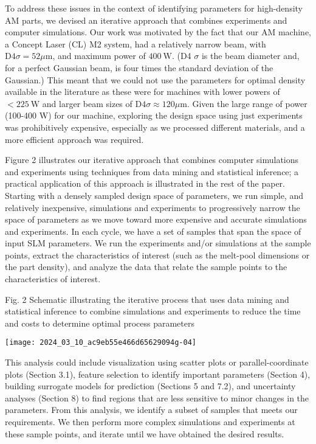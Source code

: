 \documentclass[10pt]{article}
\begin{document}
To address these issues in the context of identifying parameters for high-density AM parts, we devised an iterative approach that combines experiments and computer simulations. Our work was motivated by the fact that our AM machine, a Concept Laser (CL) M2 system, had a relatively narrow beam, with $\mathrm{D} 4 \sigma=52 \mu \mathrm{m}$, and maximum power of $400 \mathrm{~W}$. (D4 $\sigma$ is the beam diameter and, for a perfect Gaussian beam, is four times the standard deviation of the Gaussian.) This meant that we could not use the parameters for optimal density available in the literature as these were for machines with lower powers of $<225 \mathrm{~W}$ and larger beam sizes of $\mathrm{D} 4 \sigma \approx 120 \mu \mathrm{m}$. Given the large range of power (100-400 W) for our machine, exploring the design space using just experiments was prohibitively expensive, especially as we processed different materials, and a more efficient approach was required.

Figure 2 illustrates our iterative approach that combines computer simulations and experiments using techniques from data mining and statistical inference; a practical application of this approach is illustrated in the rest of the paper. Starting with a densely sampled design space of parameters, we run simple, and relatively inexpensive, simulations and experiments to progressively narrow the space of parameters as we move toward more expensive and accurate simulations and experiments. In each cycle, we have a set of samples that span the space of input SLM parameters. We run the experiments and/or simulations at the sample points, extract the characteristics of interest (such as the melt-pool dimensions or the part density), and analyze the data that relate the sample points to the characteristics of interest.

Fig. 2 Schematic illustrating the iterative process that uses data mining and statistical inference to combine simulations and experiments to reduce the time and costs to determine optimal process parameters

\begin{center}
\texttt{[image: 2024\_03\_10\_ac9eb55e466d65629094g-04]}
\end{center}

This analysis could include visualization using scatter plots or parallel-coordinate plots (Section 3.1), feature selection to identify important parameters (Section 4), building surrogate models for prediction (Sections 5 and 7.2), and uncertainty analyses (Section 8) to find regions that are less sensitive to minor changes in the parameters. From this analysis, we identify a subset of samples that meets our requirements. We then perform more complex simulations and experiments at these sample points, and iterate until we have obtained the desired results.
\end{document}
